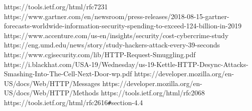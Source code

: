 \documentclass[
fontsize=11pt,
paper=a4,
abstract=true,
numbers=noenddot,
listof=totoc,
bibliography=totoc,
oneside,
cleardoublepage=plain,
parskip=half+, %
BCOR=1cm, %
]{scrreprt}
\begin{document}
















\begin{thebibliography}{00}
	 https://tools.ietf.org/html/rfc7231 
	 https://www.gartner.com/en/newsroom/press-releases/2018-08-15-gartner-forecasts-worldwide-information-security-spending-to-exceed-124-billion-in-2019
	 https://www.accenture.com/us-en/insights/security/cost-cybercrime-study
	 https://eng.umd.edu/news/story/study-hackers-attack-every-39-seconds
	 https://www.cgisecurity.com/lib/HTTP-Request-Smuggling.pdf
	 https://i.blackhat.com/USA-19/Wednesday/us-19-Kettle-HTTP-Desync-Attacks-Smashing-Into-The-Cell-Next-Door-wp.pdf
	 https://developer.mozilla.org/en-US/docs/Web/HTTP/Messages
	 https://developer.mozilla.org/en-US/docs/Web/HTTP/Methods
	 https://tools.ietf.org/html/rfc2068
	 https://tools.ietf.org/html/rfc2616\verb|#|section-4.4
	
\end{thebibliography}	
\end{document}
